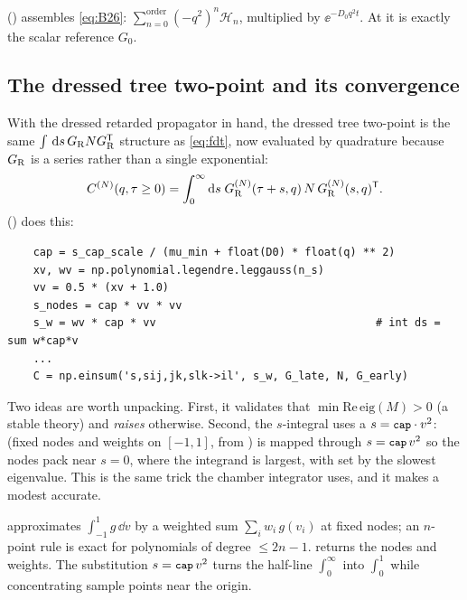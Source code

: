  ()
assembles \eqref{eq:B26}: $\sum_{n=0}^{\text{order}}(-q^{2})^{n}\mathcal{H}_{n}$,
multiplied by $\ee^{-D_{0}q^{2}t}$. At  it is exactly the scalar
reference $G_{0}$.

\subsection{The dressed tree two-point and its convergence}

With the dressed retarded propagator in hand, the dressed tree two-point is the
same $\int\,\mathrm{d} s\,G_{\mathrm R} NG_{\mathrm R}^{\mathsf T}$ structure as
\eqref{eq:fdt}, now evaluated by quadrature because $G_{\mathrm R}$ is a series rather
than a single exponential:
\begin{equation}
  C^{(N)}(q,\tau\ge0)=\int_{0}^{\infty}\mathrm{d} s\;
    G_{\mathrm R}^{(N)}(\tau+s,q)\,N\,G_{\mathrm R}^{(N)}(s,q)^{\mathsf T}.
  \label{eq:dressedC}
\end{equation}
 () does this:

\begin{lstlisting}
    cap = s_cap_scale / (mu_min + float(D0) * float(q) ** 2)
    xv, wv = np.polynomial.legendre.leggauss(n_s)
    vv = 0.5 * (xv + 1.0)
    s_nodes = cap * vv * vv
    s_w = wv * cap * vv                                  # int ds = sum w*cap*v
    ...
    C = np.einsum('s,sij,jk,slk->il', s_w, G_late, N, G_early)
\end{lstlisting}

Two ideas are worth unpacking. First, it validates that
$\min\mathrm{Re}\,\mathrm{eig}(M)>0$ (a stable theory) and \emph{raises}
otherwise. Second, the $s$-integral uses a  $s=\texttt{\small cap}\cdot v^{2}$:  (fixed
nodes  and weights  on $[-1,1]$, from ) is mapped
through $s=\texttt{\small cap}\,v^{2}$ so the nodes pack near $s=0$, where the integrand is
largest, with  set by the slowest eigenvalue. This is the same trick
the chamber integrator uses, and it makes a modest  accurate.

\begin{defn}
 approximates $\int_{-1}^{1}g\,\dd v$ by a
weighted sum $\sum_{i}w_{i}\,g(v_{i})$ at fixed nodes; an $n$-point rule is exact
for polynomials of degree $\le 2n-1$. 
returns the nodes and weights. The substitution $s=\texttt{\small cap}\,v^{2}$ turns the
half-line $\int_{0}^{\infty}$ into $\int_{0}^{1}$ while concentrating sample
points near the origin.
\end{defn}

